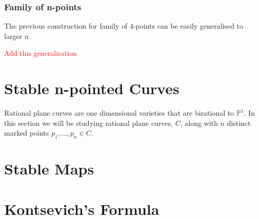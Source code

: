 \subsubsection{Family of n-points}

The previous construction for family of $4$-points can be easily generalised to larger $n$.
\par \textcolor{red}{Add this generalisation}\section{Stable n-pointed Curves}
Rational plane curves are one dimensional varieties that are birational to $\mathbb{P}^{1}$. 
In this section we will be studying rational plane curves, $C$, along with $n$ distinct marked points $p_{1},\dots, p_{n} \in C$.
\section{Stable Maps}
\section{Kontsevich's Formula}
